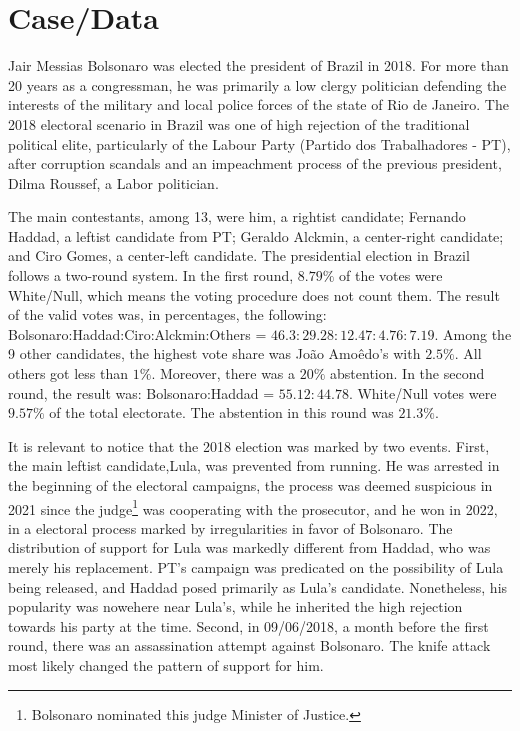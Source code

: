 \documentclass[hidelinks,11pt]{article}
\begin{document}
\section{Case/Data}

Jair Messias Bolsonaro was elected the president of Brazil in 2018. For more
than 20 years as a congressman, he was primarily a low clergy politician
defending the interests of the military and local police forces of the state of
Rio de Janeiro. The 2018 electoral scenario in Brazil was one of high rejection
of the traditional political elite, particularly of the Labour Party (Partido
dos Trabalhadores - PT), after corruption scandals and an impeachment process of
the previous president, Dilma Roussef, a Labor politician.


The main contestants, among 13, were him, a rightist candidate; Fernando Haddad,
a leftist candidate from PT; Geraldo Alckmin, a center-right candidate; and Ciro
Gomes, a center-left candidate. The presidential election in Brazil follows a
two-round system. In the first round, \(8.79\%\) of the votes were White/Null,
which means the voting procedure does not count them. The result of the valid
votes was, in percentages, the following: Bolsonaro:Haddad:Ciro:Alckmin:Others =
\(46.3:29.28:12.47:4.76:7.19 \). Among the 9 other candidates, the highest vote
share was Jo{\~a}o Amo{\^e}do's with \(2.5\%\). All others got less than
\(1\%\). Moreover, there was a \(20\%\) abstention. In the second round, the
result was: Bolsonaro:Haddad = \(55.12 : 44.78 \). White/Null votes were
\(9.57\%\) of the total electorate. The abstention in this round was \(21.3\%\).

It is relevant to notice that the 2018 election was marked by two events. First,
the main leftist candidate,Lula, was prevented from running. He was arrested in
the beginning of the electoral campaigns, the process was deemed suspicious in
2021 since the judge\footnote{Bolsonaro nominated this judge Minister of
  Justice.} was cooperating with the prosecutor, and he won in 2022, in a
electoral process marked by irregularities in favor of Bolsonaro. The
distribution of support for Lula was markedly different from Haddad, who was
merely his replacement. PT's campaign was predicated on the possibility of Lula
being released, and Haddad posed primarily as Lula's candidate. Nonetheless, his
popularity was nowehere near Lula's, while he inherited the high rejection
towards his party at the time. Second, in 09/06/2018, a month before the first
round, there was an assassination attempt against Bolsonaro. The knife attack
most likely changed the pattern of support for him.
\end{document}
